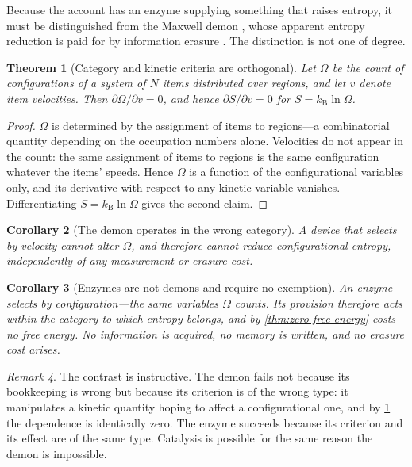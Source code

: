 \documentclass[11pt,twocolumn,a4paper]{article}
\theoremstyle{plain}
\newtheorem{theorem}{Theorem}[section]
\newtheorem{corollary}[theorem]{Corollary}
\theoremstyle{definition}
\theoremstyle{remark}
\newtheorem{remark}[theorem]{Remark}
\newcommand{\kB}{k_{\mathrm{B}}}
\begin{document}
Because the account has an enzyme supplying something that raises entropy, it
must be distinguished from the Maxwell demon \citep{maxwell1871,szilard1929},
whose apparent entropy reduction is paid for by information erasure
\citep{landauer1961,bennett1982}. The distinction is not one of degree.

\begin{theorem}[Category and kinetic criteria are orthogonal]
\label{thm:orthogonality}
Let $\Omega$ be the count of configurations of a system of $N$ items distributed
over regions, and let $v$ denote item velocities. Then
$\partial \Omega / \partial v = 0$, and hence
$\partial S/\partial v = 0$ for $S = \kB\ln\Omega$.
\end{theorem}

\begin{proof}
$\Omega$ is determined by the assignment of items to regions---a combinatorial
quantity depending on the occupation numbers alone. Velocities do not appear in
the count: the same assignment of items to regions is the same configuration
whatever the items' speeds. Hence $\Omega$ is a function of the configurational
variables only, and its derivative with respect to any kinetic variable
vanishes. Differentiating $S = \kB\ln\Omega$ gives the second claim.
\end{proof}

\begin{corollary}[The demon operates in the wrong category]
\label{cor:demon}
A device that selects by velocity cannot alter $\Omega$, and therefore cannot
reduce configurational entropy, independently of any measurement or erasure
cost.
\end{corollary}

\begin{corollary}[Enzymes are not demons and require no exemption]
\label{cor:enzyme-not-demon}
An enzyme selects by configuration---the same variables $\Omega$ counts. Its
provision therefore acts within the category to which entropy belongs, and by
\cref{thm:zero-free-energy} costs no free energy. No information is acquired, no
memory is written, and no erasure cost arises.
\end{corollary}

\begin{remark}
The contrast is instructive. The demon fails not because its bookkeeping is
wrong but because its criterion is of the wrong type: it manipulates a kinetic
quantity hoping to affect a configurational one, and by \cref{thm:orthogonality}
the dependence is identically zero. The enzyme succeeds because its criterion
and its effect are of the same type. Catalysis is possible for the same reason
the demon is impossible.
\end{remark}
\end{document}
